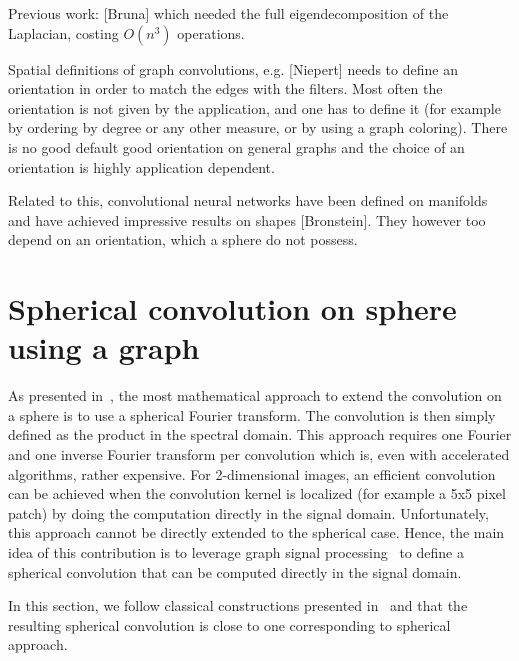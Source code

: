 \documentclass[preprint,12pt,authoryear]{elsarticle}
\newcommand{\nati}[1]{{\color[rgb]{.1,.6,.1}{#1}}}
\newcommand{\assign}[1]{{\color[rgb]{.8,.5,.8}{Assigned: #1 }}}
\begin{document}
\nati{+ add other graph CNN approaches \cite{...}}

Previous work: [Bruna] which needed the full eigendecomposition of the Laplacian, costing $O(n^3)$ operations.

Spatial definitions of graph convolutions, e.g. [Niepert] needs to define an orientation in order to match the edges with the filters. Most often the orientation is not given by the application, and one has to define it (for example by ordering by degree or any other measure, or by using a graph coloring). There is no good default good orientation on general graphs and the choice of an orientation is highly application dependent.

Related to this, convolutional neural networks have been defined on manifolds and have achieved impressive results on shapes [Bronstein]. They however too depend on an orientation, which a sphere do not possess.

\section{Spherical convolution on sphere using a graph}
\assign{Nathanael}

As presented in~\cite{cohen2018spherical}, the most mathematical approach to extend the convolution on a sphere is to use a spherical Fourier transform. The convolution is then simply defined as the product in the spectral domain. This approach requires one Fourier and one inverse Fourier transform per convolution which is, even with accelerated algorithms, rather expensive. For 2-dimensional images, an efficient convolution can be achieved when the convolution kernel is localized (for example a 5x5 pixel patch) by doing the computation directly in the signal domain. Unfortunately, this approach cannot be directly extended to the spherical case. Hence, the main idea of this contribution is to leverage graph signal processing~\cite{shuman2013emerging} to define a spherical convolution that can be computed directly in the signal domain. 

In this section, we follow classical constructions presented in~\cite{cohen2018spherical,...} and \nati{show} that the resulting spherical convolution is close to one corresponding to spherical approach.
\end{document}
